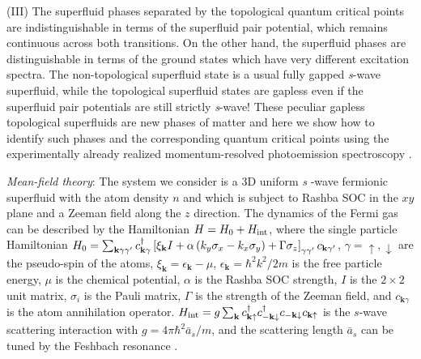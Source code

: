 \documentclass[prl,showpacs,twocolumn]{revtex4-1}
\begin{document}
(III) The superfluid phases separated by the topological quantum critical
points are indistinguishable in terms of the superfluid pair potential,
which remains continuous across both transitions. On the other hand, the
superfluid phases are distinguishable in terms of the ground states which
have very different excitation spectra. The non-topological superfluid state
is a usual fully gapped \textit{s}-wave superfluid, while the topological
superfluid states are gapless even if the superfluid pair potentials are
still strictly \textit{s}-wave! These peculiar gapless topological
superfluids are new phases of matter and here we show how to identify such
phases and the corresponding quantum critical points using the
experimentally already realized momentum-resolved photoemission spectroscopy
\cite{Jin1,Jin2}.

\emph{Mean-field theory}: The system we consider is a 3D uniform \textit{s}%
-wave fermionic superfluid with the atom density $n$ and which is subject to
Rashba SOC in the $xy$ plane and a Zeeman field along the $z$ direction. The
dynamics of the Fermi gas can be described by the Hamiltonian $H=H_{0}+H_{%
\text{int}}$, where the single particle Hamiltonian $H_{0}=\sum_{\mathbf{k}%
\gamma \gamma ^{\prime }}c_{\mathbf{k}\gamma }^{\dagger }\left[ \xi _{%
\mathbf{k}}I+\alpha \left( k_{y}\sigma _{x}-k_{x}\sigma _{y}\right) +\Gamma
\sigma _{z}\right] _{\gamma \gamma ^{\prime }}c_{\mathbf{k}\gamma ^{\prime
}} $, $\gamma =\uparrow ,\downarrow $ are the pseudo-spin of the atoms, $\xi
_{\mathbf{k}}=\epsilon _{\mathbf{k}}-\mu $, $\epsilon _{\mathbf{k}}=\hbar
^{2}k^{2}/2m$ is the free particle energy, $\mu $ is the chemical potential,
$\alpha $ is the Rashba SOC strength, $I$ is the $2\times 2$ unit matrix, $%
\sigma _{i}$ is the Pauli matrix, $\Gamma $ is the strength of the Zeeman
field, and $c_{\mathbf{k}\gamma }$ is the atom annihilation operator. $H_{%
\text{int}}=g\sum_{\mathbf{k}}c_{\mathbf{k}\uparrow }^{\dag }c_{-\mathbf{k}%
\downarrow }^{\dag }c_{-\mathbf{k}\downarrow }c_{\mathbf{k}\uparrow }$ is
the $s$-wave scattering interaction with $g=4\pi \hbar ^{2}\bar{a}_{s}/m$,
and the scattering length $\bar{a}_{s}$ can be tuned by the Feshbach
resonance \cite{Chin10}.
\end{document}
